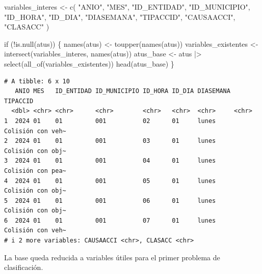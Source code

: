 \documentclass[
  spanish,
  11pt,
  letterpaper,
]{book}
\newenvironment{Shaded}{}{}
\newcommand{\ControlFlowTok}[1]{\textcolor[rgb]{0.84,0.23,0.29}{#1}}
\newcommand{\FunctionTok}[1]{\textcolor[rgb]{0.44,0.26,0.76}{#1}}
\newcommand{\NormalTok}[1]{\textcolor[rgb]{0.14,0.16,0.18}{#1}}
\newcommand{\OtherTok}[1]{\textcolor[rgb]{0.44,0.26,0.76}{#1}}
\newcommand{\SpecialCharTok}[1]{\textcolor[rgb]{0.00,0.36,0.77}{#1}}
\newcommand{\StringTok}[1]{\textcolor[rgb]{0.01,0.18,0.38}{#1}}
\begin{document}
\begin{Shaded}
\begin{Highlighting}[]
\NormalTok{variables\_interes }\OtherTok{\textless{}{-}} \FunctionTok{c}\NormalTok{(}
  \StringTok{"ANIO"}\NormalTok{, }\StringTok{"MES"}\NormalTok{, }\StringTok{"ID\_ENTIDAD"}\NormalTok{, }\StringTok{"ID\_MUNICIPIO"}\NormalTok{, }\StringTok{"ID\_HORA"}\NormalTok{, }\StringTok{"ID\_DIA"}\NormalTok{,}
  \StringTok{"DIASEMANA"}\NormalTok{, }\StringTok{"TIPACCID"}\NormalTok{, }\StringTok{"CAUSAACCI"}\NormalTok{, }\StringTok{"CLASACC"}
\NormalTok{)}

\ControlFlowTok{if}\NormalTok{ (}\SpecialCharTok{!}\FunctionTok{is.null}\NormalTok{(atus)) \{}
  \FunctionTok{names}\NormalTok{(atus) }\OtherTok{\textless{}{-}} \FunctionTok{toupper}\NormalTok{(}\FunctionTok{names}\NormalTok{(atus))}
\NormalTok{  variables\_existentes }\OtherTok{\textless{}{-}} \FunctionTok{intersect}\NormalTok{(variables\_interes, }\FunctionTok{names}\NormalTok{(atus))}
\NormalTok{  atus\_base }\OtherTok{\textless{}{-}}\NormalTok{ atus }\SpecialCharTok{|\textgreater{}} \FunctionTok{select}\NormalTok{(}\FunctionTok{all\_of}\NormalTok{(variables\_existentes))}
  \FunctionTok{head}\NormalTok{(atus\_base)}
\NormalTok{\}}
\end{Highlighting}
\end{Shaded}

\begin{verbatim}
# A tibble: 6 x 10
   ANIO MES   ID_ENTIDAD ID_MUNICIPIO ID_HORA ID_DIA DIASEMANA TIPACCID         
  <dbl> <chr> <chr>      <chr>        <chr>   <chr>  <chr>     <chr>            
1  2024 01    01         001          02      01     lunes     Colisión con veh~
2  2024 01    01         001          03      01     lunes     Colisión con obj~
3  2024 01    01         001          04      01     lunes     Colisión con pea~
4  2024 01    01         001          05      01     lunes     Colisión con obj~
5  2024 01    01         001          06      01     lunes     Colisión con obj~
6  2024 01    01         001          07      01     lunes     Colisión con veh~
# i 2 more variables: CAUSAACCI <chr>, CLASACC <chr>
\end{verbatim}

\begin{tcolorbox}[enhanced jigsaw, arc=.35mm, bottomrule=.15mm, bottomtitle=1mm, breakable, colback=white, colbacktitle=quarto-callout-tip-color!10!white, colframe=quarto-callout-tip-color-frame, coltitle=black, left=2mm, leftrule=.75mm, opacityback=0, opacitybacktitle=0.6, rightrule=.15mm, title=\textcolor{quarto-callout-tip-color}{\faLightbulb}\hspace{0.5em}{Interpretación del resultado}, titlerule=0mm, toprule=.15mm, toptitle=1mm]

La base queda reducida a variables útiles para el primer problema de
clasificación.

\end{tcolorbox}
\end{document}

